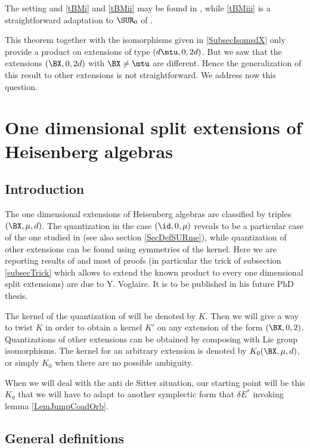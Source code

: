 The setting and \ref{tBMi} and \ref{tBMii} may be found in \cite{Biel-Massar}, while \ref{tBMiii} is a straightforward adaptation  to $\SUR_0$ of \cite{lcBBM}.

This theorem together with the isomorphisms given in \ref{SubsecIsomsdX} only provide a product on extensions of type $(d\mtu,0,2d)$. But we saw that the extensions $(\BX ,0,2d)$ with $\BX \neq\mtu$ are different. Hence the generalization of this result to other extensions is not straightforward. We address now this question.

%
   \section[Split extensions of Heisenberg algebras]{One dimensional split extensions of Heisenberg algebras} \label{SecExtHeiz}
%

\subsection{Introduction}

The one dimensional extensions of Heisenberg algebras are classified by triples $(\BX,\mu,d)$. The quantization in the case $(\id,0,\mu)$  reveals to be a particular case of the one studied in \cite{Biel-Massar} (see also section \ref{SecDefSURme}), while quantization of other extensions can be found using symmetries of the kernel. Here we are reporting results of \cite{articleBVCS} and most of proofs (in particular the trick of subsection \ref{subsecTrick} which allows to extend the known product to every one dimensional split extensions) are due to Y. Voglaire. It is to be published in his future PhD thesis.

The kernel of the quantization of \cite{Biel-Massar} will be denoted by $K$.  Then we will give a way to twist $K$ in order to obtain a kernel $K'$ on any extension of the form $(\BX,0,2)$. Quantizations of other extensions can be obtained by composing with Lie group isomorphisms. The kernel for an arbitrary extension is denoted by $K_{0}(\BX,\mu,d)$, or simply $K_{0}$ when there are no possible ambiguity.

When we will deal with the anti de Sitter situation, our starting point will be this $K_{0}$ that we will have to adapt to another symplectic form that $\delta E^*$ invoking lemma \ref{LemJumpCoadOrb}.


\subsection{General definitions}

